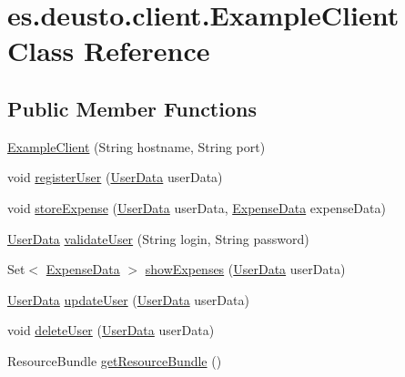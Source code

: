 \hypertarget{classes_1_1deusto_1_1client_1_1_example_client}{}\section{es.\+deusto.\+client.\+Example\+Client Class Reference}
\label{classes_1_1deusto_1_1client_1_1_example_client}
\subsection*{Public Member Functions}
\begin{DoxyCompactItemize}
\item 
\hyperlink{classes_1_1deusto_1_1client_1_1_example_client_afe4bf9d0ff661de1e0ba936df0ce807f}{Example\+Client} (String hostname, String port)
\item 
void \hyperlink{classes_1_1deusto_1_1client_1_1_example_client_a1c17371c17dde2b7664f2ad17ee79e4b}{register\+User} (\hyperlink{classes_1_1deusto_1_1serialization_1_1_user_data}{User\+Data} user\+Data)
\item 
void \hyperlink{classes_1_1deusto_1_1client_1_1_example_client_aba5fe3dfb882ef22d0bd49b5915871d3}{store\+Expense} (\hyperlink{classes_1_1deusto_1_1serialization_1_1_user_data}{User\+Data} user\+Data, \hyperlink{classes_1_1deusto_1_1serialization_1_1_expense_data}{Expense\+Data} expense\+Data)
\item 
\hyperlink{classes_1_1deusto_1_1serialization_1_1_user_data}{User\+Data} \hyperlink{classes_1_1deusto_1_1client_1_1_example_client_a740fa7000d0cd30603ce100b299ba8ba}{validate\+User} (String login, String password)
\item 
Set$<$ \hyperlink{classes_1_1deusto_1_1serialization_1_1_expense_data}{Expense\+Data} $>$ \hyperlink{classes_1_1deusto_1_1client_1_1_example_client_a527d2790290c153cae5b16133a38269a}{show\+Expenses} (\hyperlink{classes_1_1deusto_1_1serialization_1_1_user_data}{User\+Data} user\+Data)
\item 
\hyperlink{classes_1_1deusto_1_1serialization_1_1_user_data}{User\+Data} \hyperlink{classes_1_1deusto_1_1client_1_1_example_client_afbee30635a2cfe7fb7cfc58393b40bfb}{update\+User} (\hyperlink{classes_1_1deusto_1_1serialization_1_1_user_data}{User\+Data} user\+Data)
\item 
void \hyperlink{classes_1_1deusto_1_1client_1_1_example_client_a20bd33a8b93e804925b4a8e338413b00}{delete\+User} (\hyperlink{classes_1_1deusto_1_1serialization_1_1_user_data}{User\+Data} user\+Data)
\item 
Resource\+Bundle \hyperlink{classes_1_1deusto_1_1client_1_1_example_client_a85a29c19dfbfcad9d08dcc17d688d8d3}{get\+Resource\+Bundle} ()
\end{DoxyCompactItemize}
